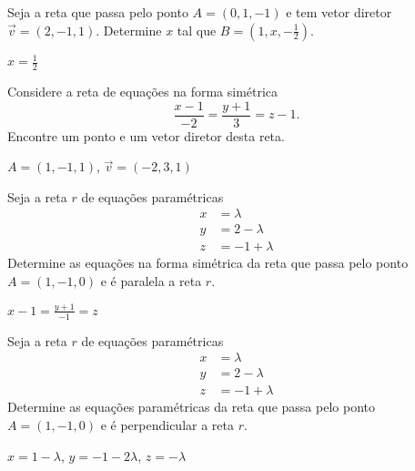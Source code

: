 \begin{exer}
  Seja a reta que passa pelo ponto $A=(0,1,-1)$ e tem vetor diretor $\vec{v}=(2,-1,1)$. Determine $x$ tal que $B=(1,x,-\frac{1}{2})$.
\end{exer}
\begin{resp}
  $x=\frac{1}{2}$
\end{resp}

\begin{exer}
  Considere a reta de equações na forma simétrica
  \begin{equation}
    \frac{x-1}{-2}=\frac{y+1}{3}=z-1.
  \end{equation}
  Encontre um ponto e um vetor diretor desta reta.
\end{exer}
\begin{resp}
  $A=(1,-1,1)$, $\vec{v}=(-2,3,1)$
\end{resp}

\begin{exer}
  Seja a reta $r$ de equações paramétricas
  \begin{align}
    x &= \lambda\\
    y &= 2-\lambda\\
    z &= -1+\lambda
  \end{align}
  Determine as equações na forma simétrica da reta que passa pelo ponto $A=(1,-1,0)$ e é paralela a reta $r$.
\end{exer}
\begin{resp}
  $x-1=\frac{y+1}{-1}=z$
\end{resp}

\begin{exer}
  Seja a reta $r$ de equações paramétricas
  \begin{align}
    x &= \lambda\\
    y &= 2-\lambda\\
    z &= -1+\lambda
  \end{align}
  Determine as equações paramétricas da reta que passa pelo ponto $A=(1,-1,0)$ e é perpendicular a reta $r$.
\end{exer}
\begin{resp}
  $x=1-\lambda$, $y=-1-2\lambda$, $z=-\lambda$
\end{resp}
